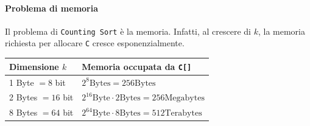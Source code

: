 \paragraph{Problema di memoria} Il problema di \texttt{Counting Sort} è la memoria. 
Infatti, al crescere di $k$, la memoria richiesta per allocare \texttt{C} cresce esponenzialmente.
\begin{center}
    \begin{tabular}{|l|l|}
        \hline
        Dimensione $k$ & Memoria occupata da \texttt{C[]} \\
        \hline
        1 Byte $= 8$ bit & $2^8 \text{Bytes} = 256 \text{Bytes}$ \\
        2 Bytes $= 16$ bit & $2^{16} \text{Byte} \cdot 2 \text{Bytes} = 256 \text{Megabytes}$ \\
        8 Bytes $= 64$ bit & $2^{64} \text{Byte} \cdot 8 \text{Bytes} = 512 \text{Terabytes}$ \\
        \hline
    \end{tabular}
\end{center}